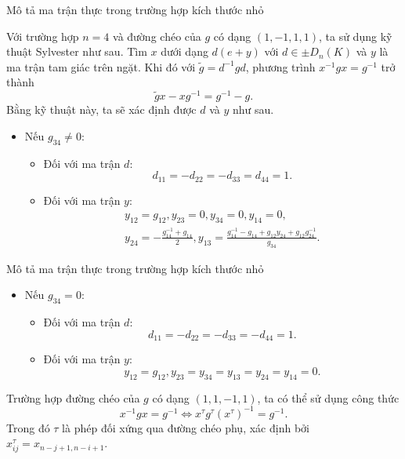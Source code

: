 \documentclass[11pt, aspectratio=169]{beamer}
\theoremstyle{plain}
\theoremstyle{definition}
\theoremstyle{remark}
\newcommand{\prfend}{\hfill\qedsymbol}
\begin{document}
\begin{frame}{Mô tả ma trận thực trong trường hợp kích thước nhỏ}

Với trường hợp \( n = 4 \) và đường chéo của \( g \) có dạng \( (1, -1, 1, 1) \), ta sử dụng kỹ thuật Sylvester như sau. Tìm \( x \) dưới dạng \( d (e + y) \) với \( d \in \pm D_n(K) \) và \( y \) là ma trận tam giác trên ngặt. Khi đó với \( \tilde{g} = d^{-1} g d \), phương trình \( x^{-1} g x = g^{-1} \) trở thành
\[
    \tilde{g} x - x g^{-1} = g^{-1} - g.
\]
Bằng kỹ thuật này, ta sẽ xác định được \( d \) và \( y \) như sau.
\begin{itemize}
    \item Nếu \( g_{34} \neq 0 \):
    \begin{itemize}
        \item Đối với ma trận \( d \): 
        \[ d_{11} = -d_{22} = -d_{33} = d_{44} = 1. \]
        \item Đối với ma trận \( y \):
        \begin{gather*}
        y_{12} = g_{12}, y_{23} = 0, y_{34} = 0,  y_{14} = 0, \\  
        y_{24} = -\frac{g^{-1}_{14} + g_{14}}{2}, y_{13} = \frac{g^{-1}_{14} - g_{14} + g_{12}y_{24} + g_{12} g^{-1}_{24}}{g_{34}}.
        \end{gather*}
    \end{itemize}
\end{itemize}

\end{frame}

\begin{frame}{Mô tả ma trận thực trong trường hợp kích thước nhỏ}
    
\begin{itemize}
    \item Nếu \( g_{34} = 0 \):
    \begin{itemize}
        \item Đối với ma trận \( d \):
        \[ d_{11} = -d_{22} = -d_{33} = -d_{44} = 1. \]
        \item Đối với ma trận \( y \):
        \[
        y_{12} = g_{12}, y_{23} = y_{34} = y_{13} = y_{24} = y_{14} = 0.
        \]
    \end{itemize}
\end{itemize}
Trường hợp đường chéo của \( g \) có dạng \( (1,1,-1,1) \), ta có thể sử dụng công thức 
\[
    x^{-1} g x = g^{-1} \Longleftrightarrow x^\tau g^\tau (x^\tau)^{-1} = g^{-1}.
\]
Trong đó \( \tau \) là phép đối xứng qua đường chéo phụ, xác định bởi \( x^\tau_{i j} = x_{n - j + 1, n - i + 1} \).
\prfend

\end{frame}
\end{document}
